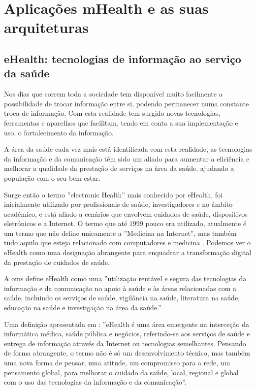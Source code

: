 \chapter{Aplica\c c\~oes mHealth e as suas arquiteturas}


\section{eHealth: tecnologias de informação ao serviço da saúde}

Nos dias que correm toda a sociedade tem dispon\'ivel muito facilmente a possibilidade de trocar informa\c c\~ao entre si, podendo permanecer numa constante troca de informa\c c\~ao.  Com esta realidade tem surgido novas tecnologias, ferramentas e aparelhos que facilitam, tendo em conta a sua implementa\c c\~ao e uso, o fortalecimento da informa\c c\~ao. 
\par
A \'area da sa\'ude cada vez mais est\'a identificada com esta realidade, as tecnologias da informa\c c\~ao e da comunica\c c\~ao t\^em sido um aliado para aumentar a efici\^encia e melhorar a qualidade da presta\c c\~ao de servi\c cos na \`area da sa\'ude, ajudando a popula\c c\~ao com o seu bem-estar. 
\par
Surge então o termo ''electronic Health'' mais conhecido por eHealth, foi inicialmente utilizado por profissionais de sa\'ude, investigadores e no \^ambito acad\'emico, e est\'a aliado a cen\'arios que envolvem cuidados de sa\'ude, dispositivos eletr\'onicos e a Internet. O termo que at\'e 1999 pouco era utilizado, atualmente \'e um termo que n\~ao define unicamente a ''Medicina na Internet'', mas tamb\'em tudo aquilo que esteja relacionado com computadores e medicina \cite{ehealth}. Podemos ver o eHealth como uma designação abrangente para enquadrar a transformação digital da prestação de cuidados de saúde.
\par A \gls{oms} define eHealth \cite{ehealth_oms} como uma ''utiliza\c c\~ao rent\'avel e segura das tecnologias da informa\c c\~ao e da comunica\c c\~ao no apoio \`a sa\'ude e \`as \'areas relacionadas com a sa\'ude, incluindo os servi\c cos de sa\'ude, vigil\^ancia na sa\'ude, literatura na sa\'ude, educa\c c\~ao na sa\'ude e investiga\c c\~ao na \'area da sa\'ude.''
\par
Uma defini\c c\~ao apresentada em \cite{ehealth}: ''eHealth \'e uma \'area emergente na interce\c c\~ao da inform\'atica m\'edica, sa\'ude p\'ublica e neg\'ocios, referindo-se aos servi\c cos de sa\'ude e entrega de informa\c c\~ao atrav\'es da Internet ou tecnologias semelhantes. Pensando de forma abrangente, o termo n\~ao \'e s\'o um desenvolvimento t\'ecnico, mas tamb\'em uma nova forma de pensar, uma atitude, um compromisso para a rede, um pensamento global, para melhorar o cuidado da sa\'ude, local, regional e global com o uso das tecnologias da informa\c c\~ao e da comunica\c c\~ao''.
